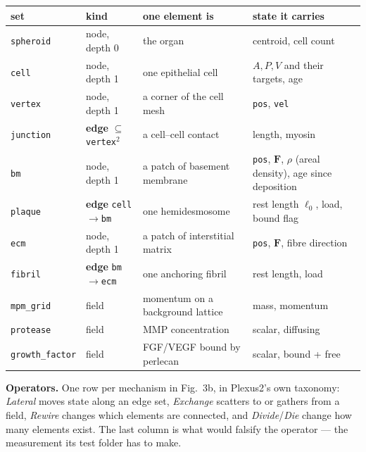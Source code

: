 \documentclass[10pt,a4paper]{article}
\newcommand{\code}[1]{\texttt{#1}}
\begin{document}
\begin{center}\small
\begin{tabular}{@{}llll@{}}\toprule
\textbf{set} & \textbf{kind} & \textbf{one element is} & \textbf{state it carries}\\\midrule
\code{spheroid}     & node, depth 0 & the organ                       & centroid, cell count\\
\quad\code{cell}    & node, depth 1 & one epithelial cell             & $A,P,V$ and their targets, age\\
\quad\code{vertex}  & node, depth 1 & a corner of the cell mesh       & \code{pos}, \code{vel}\\
\quad\code{junction}& \textbf{edge} $\subseteq$ \code{vertex}$^2$ & a cell--cell contact & length, myosin\\\midrule
\code{bm}           & node, depth 1 & a patch of basement membrane    & \code{pos}, $\mathbf F$, $\rho$ (areal density),
                                                                        age since deposition\\
\code{plaque}       & \textbf{edge} \code{cell}$\to$\code{bm} & one hemidesmosome & rest length $\ell_0$, load, bound flag\\\midrule
\code{ecm}          & node, depth 1 & a patch of interstitial matrix  & \code{pos}, $\mathbf F$, fibre direction\\
\code{fibril}       & \textbf{edge} \code{bm}$\to$\code{ecm} & one anchoring fibril & rest length, load\\\midrule
\code{mpm\_grid}    & field         & momentum on a background lattice & mass, momentum\\
\code{protease}     & field         & MMP concentration               & scalar, diffusing\\
\code{growth\_factor}& field        & FGF/VEGF bound by perlecan      & scalar, bound + free\\
\bottomrule
\end{tabular}
\end{center}

\textbf{Operators.} One row per mechanism in Fig.~3b, in Plexus2's own taxonomy: \emph{Lateral} moves
state along an edge set, \emph{Exchange} scatters to or gathers from a field, \emph{Rewire} changes
which elements are connected, and \emph{Divide}/\emph{Die} change how many elements exist. The last
column is what would falsify the operator --- the measurement its test folder has to make.
\end{document}
